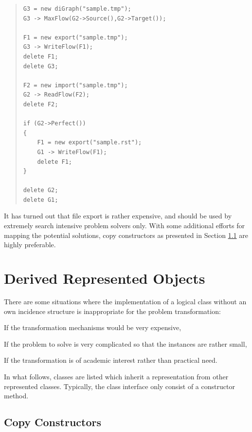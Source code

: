 \documentclass[a4paper,11pt,twoside]{book}
\begin{document}
\begin{multicols}{2}
\begin{quote}
\begin{verbatim}
G3 = new diGraph("sample.tmp");
G3 -> MaxFlow(G2->Source(),G2->Target());

F1 = new export("sample.tmp");
G3 -> WriteFlow(F1);
delete F1;
delete G3;

F2 = new import("sample.tmp");
G2 -> ReadFlow(F2);
delete F2;

if (G2->Perfect())
{
    F1 = new export("sample.rst");
    G1 -> WriteFlow(F1);
    delete F1;
}

delete G2;
delete G1;
\end{verbatim}
\end{quote}
It has turned out that file export is rather expensive, and should be used by
extremely search intensive problem solvers only. With some additional efforts
for mapping the potential solutions, copy constructors as presented in Section
\ref{slb_copy} are highly preferable.



\section{Derived Represented Objects}

There are some situations where the implementation of a logical class without
an own incidence structure is inappropriate for the problem transformation:
\begin{myitemize}
\item If the transformation mechanisms would be very expensive,
\item If the problem to solve is very complicated so that the instances
    are rather small,
\item If the transformation is of academic interest rather than practical need.
\end{myitemize}
In what follows, classes are listed which inherit a representation from other
represented classes. Typically, the class interface only consist of a
constructor method.


\subsection{Copy Constructors}
\label{slb_copy}


\end{multicols}
\end{document}
